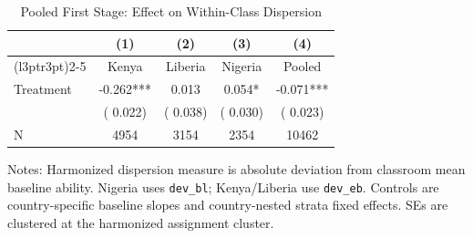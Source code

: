 \begin{table}[!htbp]
\centering
\caption{Pooled First Stage: Effect on Within-Class Dispersion}
\label{tab:pooled_dispersion}
\begin{threeparttable}
\begin{tabular}[t]{lcccc}
\toprule
 & (1) & (2) & (3) & (4) \\
\cmidrule(l{3pt}r{3pt}){2-5}
 & Kenya & Liberia & Nigeria & Pooled \\
\midrule
Treatment &  -0.262*** &   0.013 &   0.054* &  -0.071*** \\
 & (  0.022) & (  0.038) & (  0.030) & (  0.023) \\
\addlinespace
N & 4954 & 3154 & 2354 & 10462 \\
\bottomrule
\end{tabular}
\begin{tablenotes}[para]
\item Notes: Harmonized dispersion measure is absolute deviation from classroom mean baseline ability.
Nigeria uses \texttt{dev\_bl}; Kenya/Liberia use \texttt{dev\_eb}. Controls are country-specific baseline slopes and country-nested strata fixed effects. SEs are clustered at the harmonized assignment cluster.
\end{tablenotes}
\end{threeparttable}
\end{table}
